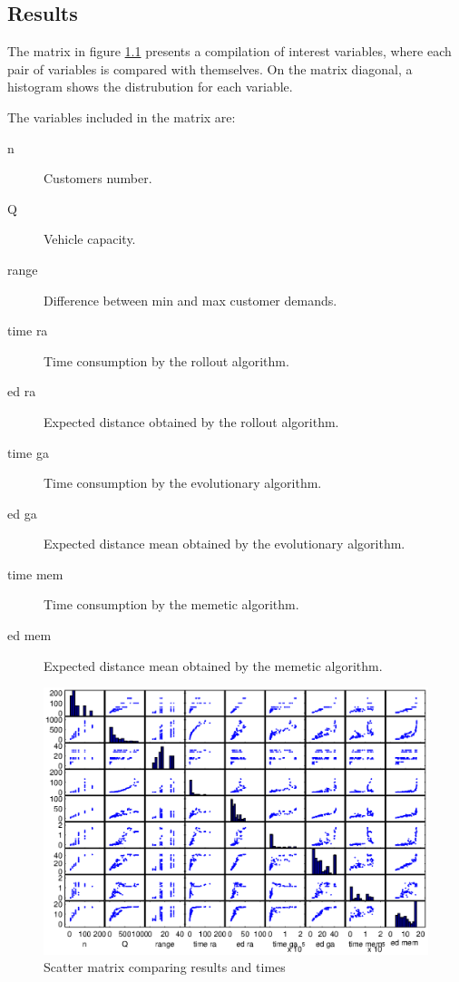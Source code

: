 \begin{appendix}
\chapter{Results}

\label{chap:appendix2}

The matrix in figure \ref{fig:comparative_results_matrix} presents a compilation of interest variables, where each pair of variables is compared with themselves. On the matrix diagonal, a histogram shows the distrubution for each variable.

The variables included in the matrix are:

\begin{description}
 \item[n] Customers number.
 \item[Q] Vehicle capacity.
 \item[range] Difference between min and max customer demands.
 \item[time ra] Time consumption by the rollout algorithm.
 \item[ed ra] Expected distance obtained by the rollout algorithm.
 \item[time ga] Time consumption by the evolutionary algorithm.
 \item[ed ga] Expected distance mean obtained by the evolutionary algorithm.
 \item[time mem] Time consumption by the memetic algorithm.
 \item[ed mem] Expected distance mean obtained by the memetic algorithm.
\end{description}


\begin{landscape}
\begin{figure}[!htbp]
  \begin{center}
   \includegraphics[width=1.4\textwidth]{Images/Chapter5/comparative_results_matrix.eps}
  \end{center}
    \caption{Scatter matrix comparing results and times}\label{fig:comparative_results_matrix}
\end{figure}


\end{landscape}
\end{appendix}
